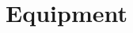\documentclass[a4paper,11pt]{article}
\begin{document}













\section{Equipment}
\end{document}
